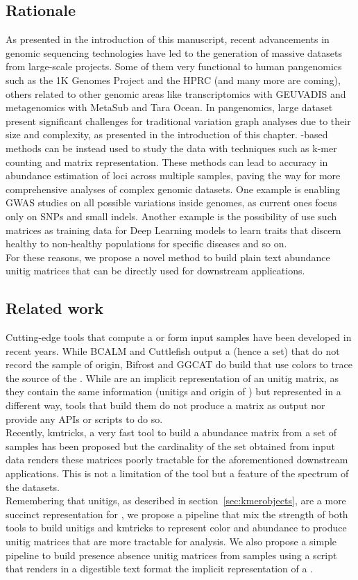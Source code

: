 \subsection{Rationale}
As presented in the introduction of this manuscript, recent advancements in genomic sequencing technologies have led to the generation of massive datasets from large-scale projects. Some of them very functional to human pangenomics such as the 1K Genomes Project and the HPRC (and many more are coming), others related to other genomic areas like transcriptomics with GEUVADIS and metagenomics with MetaSub and Tara Ocean. In pangenomics, large dataset present significant challenges for traditional variation graph analyses due to their size and complexity, as presented in the introduction of this chapter. \kmer-based methods can be instead used to study the data with techniques such as k-mer counting and matrix representation. These methods can lead to accuracy in abundance estimation of loci across multiple samples, paving the way for more comprehensive analyses of complex genomic datasets. One example is enabling GWAS studies on all possible variations inside genomes, as current ones focus only on SNPs and small indels. Another example is the possibility of use such matrices as training data for Deep Learning models to learn traits that discern healthy to non-healthy populations for specific diseases and so on.\\
For these reasons, we propose a novel method to build plain text abundance unitig matrices that can be directly used for downstream applications.

\subsection{Related work}
Cutting-edge tools that compute a \cdbg or \ccdbgs form input samples have been developed in recent years. While BCALM and Cuttlefish output   a \cdbg (hence a \kmer set) that do not record the sample of origin, Bifrost and GGCAT do build \ccdbgs that use colors to trace the source of the \kmers. While \ccdbgs are an implicit representation of an unitig matrix, as they contain the same information (unitigs and origin of \kmers) but represented in a different way, tools that build them do not produce a matrix as output nor provide any APIs or scripts to do so.\\
Recently, kmtricks, a very fast tool to build a \kmer abundance matrix from a set of samples has been proposed but the cardinality of the \kmer set obtained from input data renders these matrices poorly tractable for the aforementioned downstream applications. This is not a limitation of the tool but a feature of the \kmer spectrum of the datasets.\\
Remembering that unitigs, as described in section~\ref{sec:kmerobjects}, are a more succinct representation for \kmers, we propose a pipeline that mix the strength of both \cdbg tools to build unitigs and kmtricks to represent \kmer color and abundance to produce unitig matrices that are more tractable for analysis. We also propose a simple pipeline to build presence absence unitig matrices from samples using a script that renders in a digestible text format the implicit representation of a \ccdbg.
